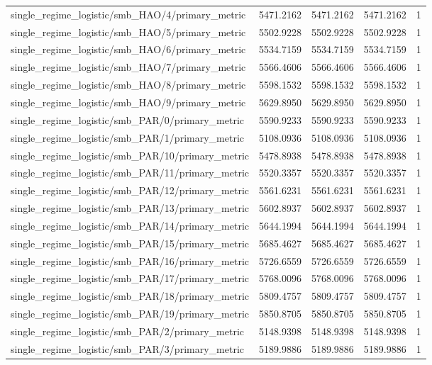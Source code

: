 \begin{table}[h]
\begin{tabular}{lrrrr}
single_regime_logistic/smb_HAO/4/primary_metric & 5471.2162 & 5471.2162 & 5471.2162 & 1 \\
single_regime_logistic/smb_HAO/5/primary_metric & 5502.9228 & 5502.9228 & 5502.9228 & 1 \\
single_regime_logistic/smb_HAO/6/primary_metric & 5534.7159 & 5534.7159 & 5534.7159 & 1 \\
single_regime_logistic/smb_HAO/7/primary_metric & 5566.4606 & 5566.4606 & 5566.4606 & 1 \\
single_regime_logistic/smb_HAO/8/primary_metric & 5598.1532 & 5598.1532 & 5598.1532 & 1 \\
single_regime_logistic/smb_HAO/9/primary_metric & 5629.8950 & 5629.8950 & 5629.8950 & 1 \\
single_regime_logistic/smb_PAR/0/primary_metric & 5590.9233 & 5590.9233 & 5590.9233 & 1 \\
single_regime_logistic/smb_PAR/1/primary_metric & 5108.0936 & 5108.0936 & 5108.0936 & 1 \\
single_regime_logistic/smb_PAR/10/primary_metric & 5478.8938 & 5478.8938 & 5478.8938 & 1 \\
single_regime_logistic/smb_PAR/11/primary_metric & 5520.3357 & 5520.3357 & 5520.3357 & 1 \\
single_regime_logistic/smb_PAR/12/primary_metric & 5561.6231 & 5561.6231 & 5561.6231 & 1 \\
single_regime_logistic/smb_PAR/13/primary_metric & 5602.8937 & 5602.8937 & 5602.8937 & 1 \\
single_regime_logistic/smb_PAR/14/primary_metric & 5644.1994 & 5644.1994 & 5644.1994 & 1 \\
single_regime_logistic/smb_PAR/15/primary_metric & 5685.4627 & 5685.4627 & 5685.4627 & 1 \\
single_regime_logistic/smb_PAR/16/primary_metric & 5726.6559 & 5726.6559 & 5726.6559 & 1 \\
single_regime_logistic/smb_PAR/17/primary_metric & 5768.0096 & 5768.0096 & 5768.0096 & 1 \\
single_regime_logistic/smb_PAR/18/primary_metric & 5809.4757 & 5809.4757 & 5809.4757 & 1 \\
single_regime_logistic/smb_PAR/19/primary_metric & 5850.8705 & 5850.8705 & 5850.8705 & 1 \\
single_regime_logistic/smb_PAR/2/primary_metric & 5148.9398 & 5148.9398 & 5148.9398 & 1 \\
single_regime_logistic/smb_PAR/3/primary_metric & 5189.9886 & 5189.9886 & 5189.9886 & 1 \\

\end{tabular}
\end{table}
